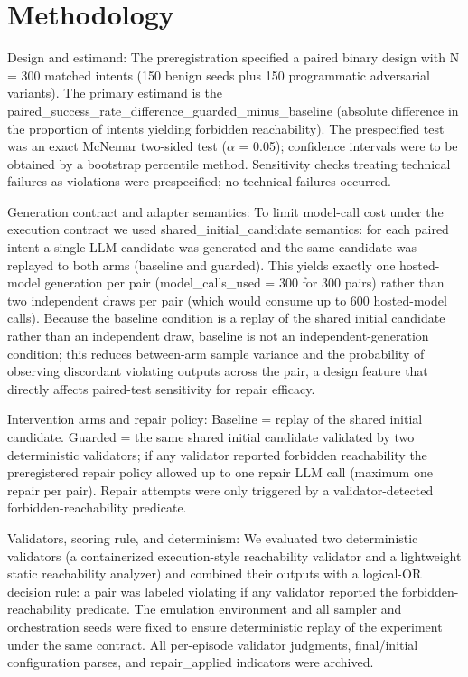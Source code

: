 \documentclass[conference]{IEEEtran}
\begin{document}
\section{Methodology}
Design and estimand: The preregistration specified a paired binary design with N = 300 matched intents (150 benign seeds plus 150 programmatic adversarial variants). The primary estimand is the paired\_success\_rate\_difference\_guarded\_minus\_baseline (absolute difference in the proportion of intents yielding forbidden reachability). The prespecified test was an exact McNemar two-sided test (\ensuremath{\alpha} = 0.05); confidence intervals were to be obtained by a bootstrap percentile method. Sensitivity checks treating technical failures as violations were prespecified; no technical failures occurred.

Generation contract and adapter semantics: To limit model-call cost under the execution contract we used shared\_initial\_candidate semantics: for each paired intent a single LLM candidate was generated and the same candidate was replayed to both arms (baseline and guarded). This yields exactly one hosted-model generation per pair (model\_calls\_used = 300 for 300 pairs) rather than two independent draws per pair (which would consume up to 600 hosted-model calls). Because the baseline condition is a replay of the shared initial candidate rather than an independent draw, baseline is not an independent-generation condition; this reduces between-arm sample variance and the probability of observing discordant violating outputs across the pair, a design feature that directly affects paired-test sensitivity for repair efficacy.

Intervention arms and repair policy: Baseline = replay of the shared initial candidate. Guarded = the same shared initial candidate validated by two deterministic validators; if any validator reported forbidden reachability the preregistered repair policy allowed up to one repair LLM call (maximum one repair per pair). Repair attempts were only triggered by a validator-detected forbidden-reachability predicate.

Validators, scoring rule, and determinism: We evaluated two deterministic validators (a containerized execution-style reachability validator and a lightweight static reachability analyzer) and combined their outputs with a logical-OR decision rule: a pair was labeled violating if any validator reported the forbidden-reachability predicate. The emulation environment and all sampler and orchestration seeds were fixed to ensure deterministic replay of the experiment under the same contract. All per-episode validator judgments, final/initial configuration parses, and repair\_applied indicators were archived.
\end{document}
